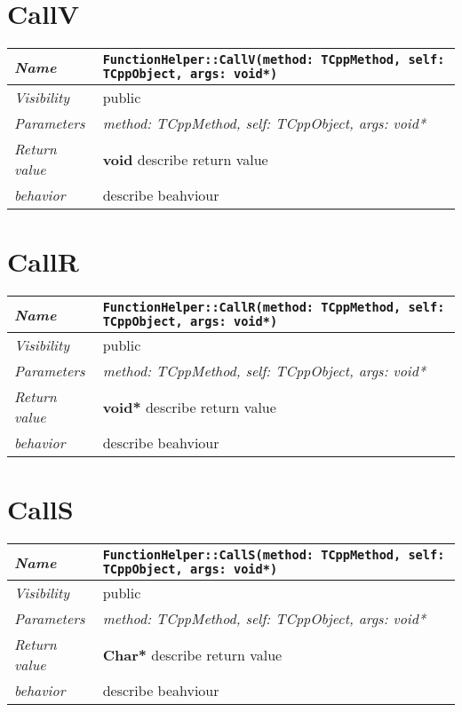  \section{CallV}
\begin{longtable}{p{3cm} @{\hskip 1cm} p{12cm}}
 \hline
\textit{Name} & \texttt{FunctionHelper::CallV(method: TCppMethod, self: TCppObject, args: void*)}\\
\hline
 \textit{Visibility} & public\\
\hline
\textit{Parameters} & \textit{method: TCppMethod, self: TCppObject, args: void*}\\
\hline
\textit{Return value} & \textbf{ void} describe return value\\
  \hline
 \textit{behavior} & describe beahviour \\
\hline
\end{longtable} \pagebreak
 \section{CallR}
\begin{longtable}{p{3cm} @{\hskip 1cm} p{12cm}}
 \hline
\textit{Name} & \texttt{FunctionHelper::CallR(method: TCppMethod, self: TCppObject, args: void*)}\\
\hline
 \textit{Visibility} & public\\
\hline
\textit{Parameters} & \textit{method: TCppMethod, self: TCppObject, args: void*}\\
\hline
\textit{Return value} & \textbf{ void*} describe return value\\
  \hline
 \textit{behavior} & describe beahviour \\
\hline
\end{longtable} \pagebreak
 \section{CallS}
\begin{longtable}{p{3cm} @{\hskip 1cm} p{12cm}}
 \hline
\textit{Name} & \texttt{FunctionHelper::CallS(method: TCppMethod, self: TCppObject, args: void*)}\\
\hline
 \textit{Visibility} & public\\
\hline
\textit{Parameters} & \textit{method: TCppMethod, self: TCppObject, args: void*}\\
\hline
\textit{Return value} & \textbf{ Char*} describe return value\\
  \hline
 \textit{behavior} & describe beahviour \\
\hline
\end{longtable} \pagebreak

